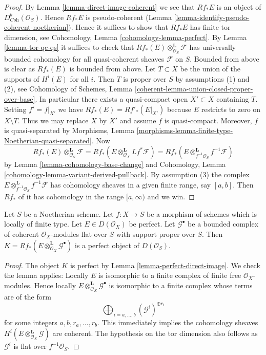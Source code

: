 \begin{proof}
By Lemma \ref{lemma-direct-image-coherent} we see that $Rf_*E$ is an object of
$D^b_{\textit{Coh}}(\mathcal{O}_S)$. Hence $Rf_*E$ is pseudo-coherent
(Lemma \ref{lemma-identify-pseudo-coherent-noetherian}).
Hence it suffices to show that $Rf_*E$ has finite tor dimension, see
Cohomology, Lemma \ref{cohomology-lemma-perfect}.
By Lemma \ref{lemma-tor-qc-qs} it suffices to check that
$Rf_*(E) \otimes_{\mathcal{O}_S}^\mathbf{L} \mathcal{F}$
has universally bounded cohomology for all quasi-coherent
sheaves $\mathcal{F}$ on $S$. Bounded from above is clear as $Rf_*(E)$
is bounded from above. Let $T \subset X$ be the union of the supports
of $H^i(E)$ for all $i$. Then $T$ is proper over $S$ by assumptions
(1) and (2), see Cohomology of Schemes, Lemma
\ref{coherent-lemma-union-closed-proper-over-base}.
In particular there exists a quasi-compact open
$X' \subset X$ containing $T$. Setting $f' = f|_{X'}$ we have
$Rf_*(E) = Rf'_*(E|_{X'})$ because $E$ restricts to zero on $X \setminus T$.
Thus we may replace $X$ by $X'$ and assume $f$ is quasi-compact.
Moreover, $f$ is quasi-separated by Morphisms, Lemma
\ref{morphisms-lemma-finite-type-Noetherian-quasi-separated}. Now
$$
Rf_*(E) \otimes_{\mathcal{O}_S}^\mathbf{L} \mathcal{F} =
Rf_*\left(E \otimes_{\mathcal{O}_X}^\mathbf{L} Lf^*\mathcal{F}\right) =
Rf_*\left(E \otimes_{f^{-1}\mathcal{O}_S}^\mathbf{L} f^{-1}\mathcal{F}\right)
$$
by
Lemma \ref{lemma-cohomology-base-change}
and
Cohomology, Lemma \ref{cohomology-lemma-variant-derived-pullback}.
By assumption (3) the complex
$E \otimes_{f^{-1}\mathcal{O}_S}^\mathbf{L} f^{-1}\mathcal{F}$
has cohomology sheaves in a
given finite range, say $[a, b]$. Then $Rf_*$ of it
has cohomology in the range $[a, \infty)$ and we win.
\end{proof}

\begin{lemma}
\label{lemma-tensor-perfect}
Let $S$ be a Noetherian scheme. Let $f : X \to S$ be a morphism of schemes
which is locally of finite type. Let $E \in D(\mathcal{O}_X)$ be perfect.
Let $\mathcal{G}^\bullet$ be a bounded complex of coherent
$\mathcal{O}_X$-modules flat over $S$ with support proper over $S$.
Then $K = Rf_*(E \otimes_{\mathcal{O}_X}^\mathbf{L} \mathcal{G}^\bullet)$
is a perfect object of $D(\mathcal{O}_S)$.
\end{lemma}

\begin{proof}
The object $K$ is perfect by Lemma \ref{lemma-perfect-direct-image}.
We check the lemma applies: Locally $E$ is isomorphic to a finite complex
of finite free $\mathcal{O}_X$-modules. Hence locally
$E \otimes^\mathbf{L}_{\mathcal{O}_X} \mathcal{G}^\bullet$ is isomorphic
to a finite complex whose terms are of the form
$$
\bigoplus\nolimits_{i = a, \ldots, b} (\mathcal{G}^i)^{\oplus r_i}
$$
for some integers $a, b, r_a, \ldots, r_b$. This immediately implies the
cohomology sheaves $H^i(E \otimes^\mathbf{L}_{\mathcal{O}_X} \mathcal{G})$
are coherent. The hypothesis on the tor dimension also follows as
$\mathcal{G}^i$ is flat over $f^{-1}\mathcal{O}_S$.
\end{proof}

